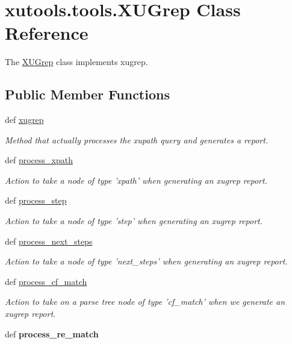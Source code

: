 \hypertarget{classxutools_1_1tools_1_1_x_u_grep}{\section{xutools.\-tools.\-X\-U\-Grep Class Reference}
\label{classxutools_1_1tools_1_1_x_u_grep}
}


The \hyperlink{classxutools_1_1tools_1_1_x_u_grep}{X\-U\-Grep} class implements xugrep.  


\subsection*{Public Member Functions}
\begin{DoxyCompactItemize}
\item 
def \hyperlink{classxutools_1_1tools_1_1_x_u_grep_a5f16a7d8f3102777954463d64b428de4}{xugrep}
\begin{DoxyCompactList}\small\item\em Method that actually processes the xupath query and generates a report. \end{DoxyCompactList}\item 
def \hyperlink{classxutools_1_1tools_1_1_x_u_grep_ac005f2a1b9da07214791cfc065e146ed}{process\-\_\-xpath}
\begin{DoxyCompactList}\small\item\em Action to take a node of type 'xpath' when generating an xugrep report. \end{DoxyCompactList}\item 
def \hyperlink{classxutools_1_1tools_1_1_x_u_grep_a80cb3a12742765b85ef47a3b95d60b89}{process\-\_\-step}
\begin{DoxyCompactList}\small\item\em Action to take a node of type 'step' when generating an xugrep report. \end{DoxyCompactList}\item 
def \hyperlink{classxutools_1_1tools_1_1_x_u_grep_ad912c35bc6cdf8a85e1b332ed84fead4}{process\-\_\-next\-\_\-steps}
\begin{DoxyCompactList}\small\item\em Action to take a node of type 'next\-\_\-steps' when generating an xugrep report. \end{DoxyCompactList}\item 
def \hyperlink{classxutools_1_1tools_1_1_x_u_grep_a9066b53791053cefa5cab2ba716d1022}{process\-\_\-cf\-\_\-match}
\begin{DoxyCompactList}\small\item\em Action to take on a parse tree node of type 'cf\-\_\-match' when we generate an xugrep report. \end{DoxyCompactList}\item 
\hypertarget{classxutools_1_1tools_1_1_x_u_grep_ae3a9d7cc73de8cc93f4fd14096e2fb64}{def {\bfseries process\-\_\-re\-\_\-match}}\label{classxutools_1_1tools_1_1_x_u_grep_ae3a9d7cc73de8cc93f4fd14096e2fb64}


\end{DoxyCompactItemize}
